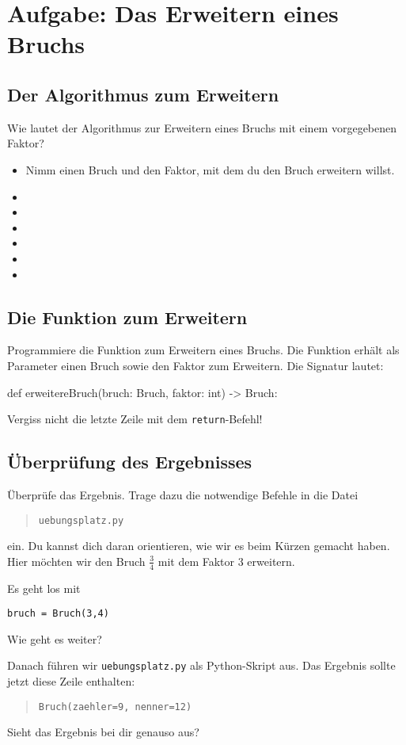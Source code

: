 \section{Aufgabe: Das Erweitern eines Bruchs}

\subsection*{Der Algorithmus zum Erweitern}

Wie lautet der Algorithmus zur Erweitern eines Bruchs mit einem vorgegebenen Faktor?


\begin{itemize}[itemsep=2ex]
	\item Nimm einen Bruch und den Faktor, mit dem du den Bruch erweitern willst.
	\item  
	\item  
	\item  
	\item 
	\item  
	\item
\end{itemize}

\subsection*{Die Funktion zum Erweitern}

Programmiere die Funktion zum Erweitern eines Bruchs. Die Funktion erhält als Parameter einen Bruch sowie den Faktor zum Erweitern. Die Signatur lautet:

\begin{codePython}
def erweitereBruch(bruch: Bruch, faktor: int) -> Bruch:
\end{codePython}

Vergiss nicht die letzte Zeile mit dem \texttt{return}-Befehl!

\subsection*{Überprüfung des Ergebnisses}

Überprüfe das Ergebnis. Trage dazu die notwendige Befehle in die Datei
\begin{quote}
	\texttt{uebungsplatz.py}
\end{quote}
ein. Du kannst dich daran orientieren, wie wir es beim Kürzen gemacht haben. Hier möchten wir den Bruch $\frac{3}{4}$ mit dem Faktor 3 erweitern.

Es geht los mit

\lstset{style=syntaxPython}
\begin{lstlisting}
bruch = Bruch(3,4)
\end{lstlisting}

Wie geht es weiter?

Danach führen wir \texttt{uebungsplatz.py} als Python-Skript aus. Das Ergebnis sollte jetzt diese Zeile enthalten:
\begin{quote}
\texttt{Bruch(zaehler=9, nenner=12)}
\end{quote}

Sieht das Ergebnis bei dir genauso aus?
